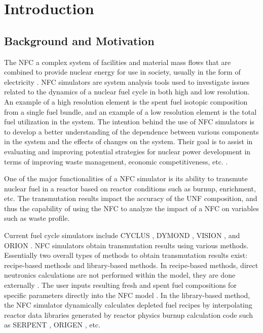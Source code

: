 \section{Introduction}



\subsection{Background and Motivation}
The \gls{NFC} a complex system of facilities and material 
mass flows that are combined to provide nuclear energy for use 
in society, usually in the form of electricity 
\cite{yacout_modeling_2005}. 
\gls{NFC} simulators are system analysis tools used to investigate 
issues related to the dynamics of a nuclear fuel cycle in both 
high and low resolution. 
An example of a high resolution element is the spent fuel 
isotopic composition from a single fuel bundle, and an example 
of a low resolution element is the total fuel utilization in 
the system. 
The intention behind the use of \gls{NFC} simulators is to develop 
a better understanding of the dependence between various components 
in the system and the effects of changes on the system. 
Their goal is to assist in evaluating and improving potential 
strategies for nuclear power development in terms of improving waste 
management, economic competitiveness, etc. \cite{yacout_modeling_2005}.   

One of the major functionalities of a \gls{NFC} simulator is its 
ability to transmute nuclear fuel in a reactor based on reactor 
conditions such as burnup, enrichment, etc. 
The transmutation results impact the accuracy of the \gls{UNF} 
composition, and thus the capability of using the \gls{NFC} to 
analyze the impact of a \gls{NFC} on variables such as waste profile.  

Current fuel cycle simulators include 
CYCLUS \cite{huff_fundamental_2016},
DYMOND \cite{yacout_modeling_2005},
VISION \cite{jacobson_verifiable_2010},
and
ORION \cite{gregg_analysis_2012}.
NFC simulators obtain transmutation results using 
various methods.  
Essentially two overall types of methods to obtain transmutation 
results exist: recipe-based methods and library-based methods. 
In recipe-based methods, direct neutronics calculations are not performed 
within the model, they are done externally \cite{yacout_vision_2006}. 
The user inputs resulting fresh and spent fuel compositions for specific parameters directly into the \gls{NFC} model \cite{sunny_transition_2015}. 
In the library-based method,  the \gls{NFC} simulator dynamically calculates depleted 
fuel recipes by interpolating reactor data libraries generated by
reactor physics burnup calculation code such as SERPENT 
\cite{leppanen_serpent_2013}, \gls{ORIGEN} \cite{croff_users_1980}, etc. 

